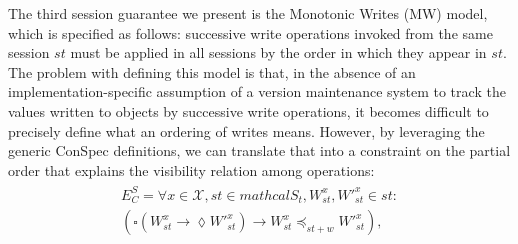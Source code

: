 \documentclass[journal, compsoc]{IEEEtran}
\begin{document}
	The third session guarantee we present is the Monotonic Writes (MW) model, which is specified as follows: successive write operations invoked from the same session $st$ must be applied in all sessions by the order in which they appear in $st$. The problem with defining this model is that, in the absence of an implementation-specific assumption of a version maintenance system to track the values written to objects by successive write operations, it becomes difficult to precisely define what an ordering of writes means. However, by leveraging the generic ConSpec definitions, we can translate that into a constraint on the partial order that explains the visibility relation among operations:
	\begin{align}\label{eqn:MW}
	\begin{split}
	E^S_C =   \forall x \in \mathcal{X}, \mathit{st} \in mathcal{S}_t, W_\mathit{st}^x, W'^x_\mathit{st} \in \mathit{st}: \\ \left( \square \left( W_\mathit{st}^x \rightarrow \lozenge W'^{x}_\mathit{st} \right)
	\rightarrow W_\mathit{st}^x \preccurlyeq_{\mathit{st}+w} W'^{x}_\mathit{st} \right),

\end{split}
\end{align}
\end{document}
